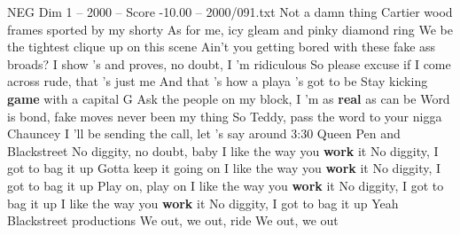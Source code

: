 \begin{textsample}{NEG Dim 1 – 2000 – Score -10.00 – 2000/091.txt}
Not a damn thing Cartier wood frames sported by my shorty As for me, icy gleam and pinky diamond ring We be the tightest clique up on this scene Ain't you getting bored with these fake ass broads?
I show 's and proves, no doubt, I 'm ridiculous So please excuse if I come across rude, that 's just me And that 's how a playa 's got to be Stay kicking \textbf{game} with a capital G Ask the people on my block, I 'm as \textbf{real} as can be Word is bond, fake moves never been my thing So Teddy, pass the word to your nigga Chauncey I 'll be sending the call, let 's say around 3:30 Queen Pen and Blackstreet No diggity, no doubt, baby I like the way you \textbf{work} it No diggity, I got to bag it up Gotta keep it going on I like the way you \textbf{work} it No diggity, I got to bag it up Play on, play on I like the way you \textbf{work} it No diggity, I got to bag it up I like the way you \textbf{work} it No diggity, I got to bag it up Yeah Blackstreet productions We out, we out, ride We out, we out

\end{textsample}
